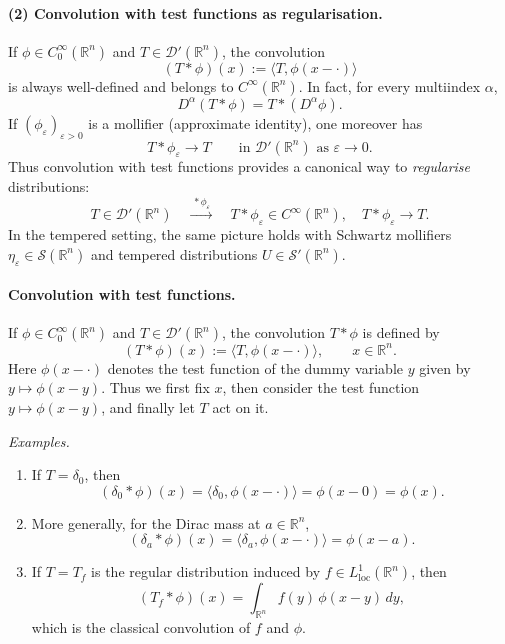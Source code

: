 \documentclass[12pt,a4paper]{article}
\theoremstyle{plain}
\theoremstyle{definition}
\theoremstyle{remark}
\theoremstyle{remark}
\begin{document}
\paragraph{(2) Convolution with test functions as regularisation.}
If $\phi\in C_0^\infty(\mathbb{R}^n)$ and $T\in\mathcal{D}'(\mathbb{R}^n)$,
the convolution
\[
(T*\phi)(x) := \big\langle T, \phi(x-\cdot)\big\rangle
\]
is always well-defined and belongs to $C^\infty(\mathbb{R}^n)$. In fact,
for every multiindex $\alpha$,
\[
D^\alpha(T*\phi) = T*(D^\alpha\phi).
\]
If $(\phi_\varepsilon)_{\varepsilon>0}$ is a mollifier (approximate
identity), one moreover has
\[
T*\phi_\varepsilon \longrightarrow T
\qquad\text{in }\mathcal{D}'(\mathbb{R}^n)\text{ as }\varepsilon\to0.
\]
Thus convolution with test functions provides a canonical way to
\emph{regularise} distributions:
\[
T \in \mathcal{D}'(\mathbb{R}^n)
\quad \xrightarrow{\ *\phi_\varepsilon\ }
\quad T*\phi_\varepsilon \in C^\infty(\mathbb{R}^n),
\quad T*\phi_\varepsilon \to T.
\]
In the tempered setting, the same picture holds with Schwartz
mollifiers $\eta_\varepsilon\in\mathcal{S}(\mathbb{R}^n)$ and tempered
distributions $U\in\mathcal{S}'(\mathbb{R}^n)$.


\paragraph{Convolution with test functions.}
If $\phi\in C_0^\infty(\mathbb{R}^n)$ and $T\in\mathcal{D}'(\mathbb{R}^n)$,
the convolution $T*\phi$ is defined by
\[
(T*\phi)(x) := \langle T,\phi(x-\cdot)\rangle,
\qquad x\in\mathbb{R}^n.
\]
Here $\phi(x-\cdot)$ denotes the test function of the dummy variable
$y$ given by $y\mapsto\phi(x-y)$. Thus we first fix $x$, then consider
the test function $y\mapsto\phi(x-y)$, and finally let $T$ act on it.

\medskip
\noindent\emph{Examples.}
\begin{enumerate}
	\item If $T=\delta_0$, then
	\[
	(\delta_0*\phi)(x)
	= \langle\delta_0,\phi(x-\cdot)\rangle
	= \phi(x-0) = \phi(x).
	\]
	\item More generally, for the Dirac mass at $a\in\mathbb{R}^n$,
	\[
	(\delta_a*\phi)(x)
	= \langle\delta_a,\phi(x-\cdot)\rangle
	= \phi(x-a).
	\]
	\item If $T=T_f$ is the regular distribution induced by
	$f\in L^1_{\mathrm{loc}}(\mathbb{R}^n)$, then
	\[
	(T_f*\phi)(x)
	= \int_{\mathbb{R}^n} f(y)\,\phi(x-y)\,dy,
	\]
	which is the classical convolution of $f$ and $\phi$.
\end{enumerate}
\end{document}
